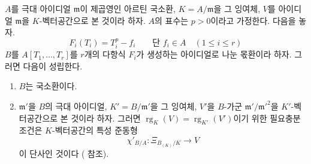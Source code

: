 \begin{proposition}[22.4.7]
\label{0.22.4.7-ko}
$A$를 극대 아이디얼 $\mathfrak m$이 제곱영인 아르틴 국소환,
$K=A/\mathfrak m$을 그 잉여체, $V$를 아이디얼 $\mathfrak m$을
$K$-벡터공간으로 본 것이라 하자. $A$의 표수는 $p>0$이라고 가정한다.
다음을 놓자.
\begin{equation}
\label{0.22.4.7.1-ko}
  F_i(T_i)=T_i^p-f_i\qquad\text{단 }f_i\in A\quad(1\leqslant i\leqslant r)
  \tag{22.4.7.1}
\end{equation}
$B$를 $A[T_1,\ldots,T_r]$를 $r$개의 다항식 $F_i$가 생성하는
아이디얼로 나눈 몫환이라 하자. 그러면 다음이 성립한다.
\begin{enumerate}
  \item[\rm(i)] $B$는 국소환이다.
  \item[\rm(ii)] $\mathfrak m'$을 $B$의 극대 아이디얼,
  $K'=B/\mathfrak m'$을 그 잉여체, $V'$을 $B$-가군
  $\mathfrak m'/\mathfrak m'^2$을 $K'$-벡터공간으로 본 것이라 하자.
  그러면 $\operatorname{rg}_K(V)=\operatorname{rg}_{K'}(V')$이기 위한
  필요충분조건은 $K$-벡터공간의 특성 준동형
  \begin{equation}
  \label{0.22.4.7.2-ko}
    \chi'_{B/A}:\Xi_{B_{(K)}/K}\longrightarrow V
    \tag{22.4.7.2}
  \end{equation}
  이 단사인 것이다 ( 참조).
\end{enumerate}
\end{proposition}

